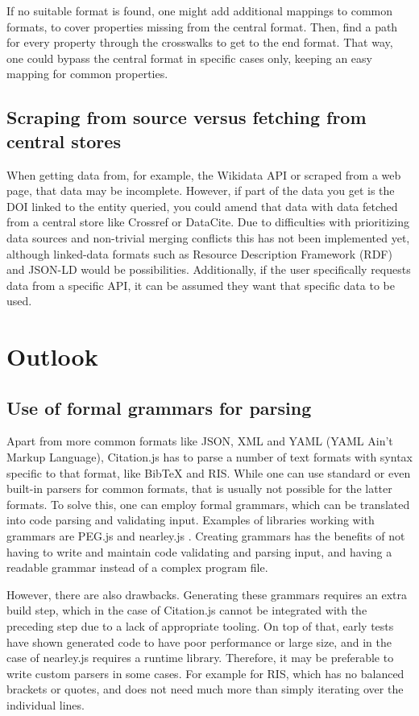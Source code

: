 \documentclass[fleqn,10pt,lineno]{wlpeerj} %
\begin{document}
If no suitable format is found, one might add additional mappings to common formats, to cover properties missing from the central format. Then, find a path for every property through the crosswalks to get to the end format. That way, one could bypass the central format in specific cases only, keeping an easy mapping for common properties.

\subsection*{Scraping from source versus fetching from central stores}

When getting data from, for example, the Wikidata API or scraped from a web page, that data may be incomplete. However, if part of the data you get is the DOI linked to the entity queried, you could amend that data with data fetched from a central store like Crossref or DataCite. Due to difficulties with prioritizing data sources and non-trivial merging conflicts this has not been implemented yet, although linked-data formats such as Resource Description Framework (RDF) and JSON-LD would be possibilities. Additionally, if the user specifically requests data from a specific API, it can be assumed they want that specific data to be used.

\section*{Outlook}

\subsection*{Use of formal grammars for parsing}

Apart from more common formats like JSON, XML and YAML (YAML Ain't Markup Language), Citation.js has to parse a number of text formats with syntax specific to that format, like BibTeX and RIS. While one can use standard or even built-in parsers for common formats, that is usually not possible for the latter formats.
To solve this, one can employ formal grammars, which can be translated into code parsing and validating input. Examples of libraries working with grammars are PEG.js \citep{Majda2018pegjs/pegjs} and nearley.js \citep{Kartik2018kach/nearley}. Creating grammars has the benefits of not having to write and maintain code validating and parsing input, and having a readable grammar instead of a complex program file.

However, there are also drawbacks. Generating these grammars requires an extra build step, which in the case of Citation.js cannot be integrated with the preceding step due to a lack of appropriate tooling. On top of that, early tests have shown generated code to have poor performance or large size, and in the case of nearley.js requires a runtime library. Therefore, it may be preferable to write custom parsers in some cases. For example for RIS, which has no balanced brackets or quotes, and does not need much more than simply iterating over the individual lines.
\end{document}
